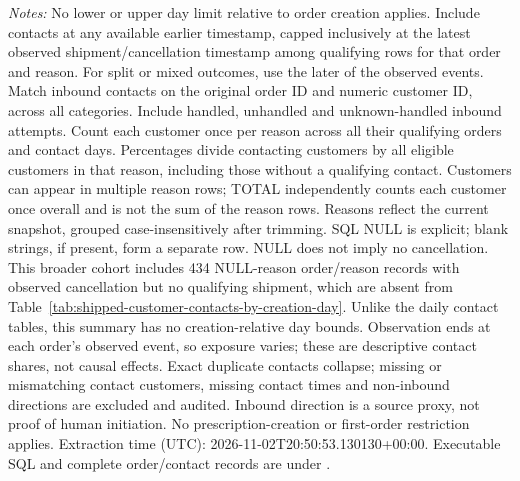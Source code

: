 \begin{table}[!htbp]
\begin{minipage}{\linewidth}
\footnotesize
\textit{Notes:} No lower or upper day limit relative to order creation applies.
Include contacts at any available earlier timestamp, capped inclusively at the
latest observed shipment/cancellation timestamp among
qualifying rows for that order and reason. For split or mixed outcomes, use the
later of the observed events. Match inbound contacts on the original order ID
and numeric customer ID, across all categories. Include handled, unhandled and unknown-handled inbound attempts.
Count each customer once per reason across all their qualifying orders and
contact days. Percentages divide contacting customers by all eligible customers
in that reason, including those without a qualifying contact. Customers can
appear in multiple reason rows; TOTAL independently counts each customer once
overall and is not the sum of the reason rows. Reasons reflect the current
snapshot, grouped case-insensitively after trimming. SQL NULL is explicit;
blank strings, if present, form a separate row. NULL does not imply no cancellation.
This broader cohort includes 434
NULL-reason order/reason records with observed cancellation but no qualifying
shipment, which are absent from Table~\ref{tab:shipped-customer-contacts-by-creation-day}.
Unlike the daily contact tables, this summary has no creation-relative day bounds.
Observation ends at each order's observed
event, so exposure varies; these are descriptive contact shares, not causal effects.
Exact duplicate contacts collapse; missing or mismatching contact customers,
missing contact times and non-inbound directions are excluded and audited.
Inbound direction is a source proxy, not proof of human initiation.
No prescription-creation or first-order restriction applies.
Extraction time (UTC): 2026-11-02T20:50:53.130130+00:00.
Executable SQL and complete order/contact records are under
.
\end{minipage}
\end{table}
